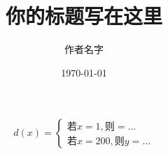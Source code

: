 \documentclass[UTF8]{ctexart}
\title{你的标题写在这里}
\author{作者名字}
\date{\today}
\begin{document}
	\tableofcontents %
	\maketitle  %
	
	\begin{equation}
		d(x)=
		\begin{cases}
			\text{若}x=1, \text{则}= ... \\
			\text{若}x=200, \text{则} y= ... 
		\end{cases}
	\end{equation}
\end{document}
